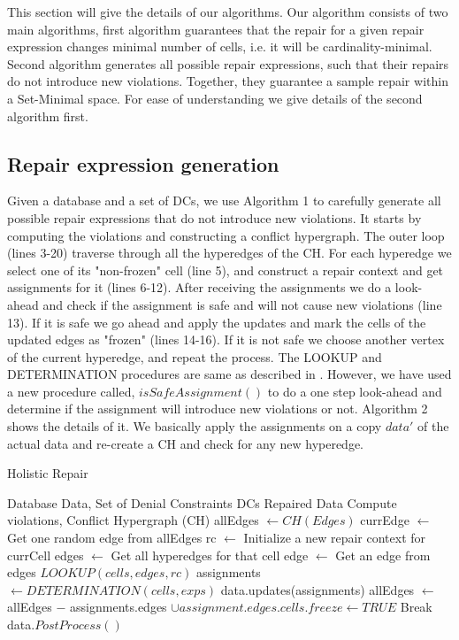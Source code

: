 This section will give the details of our algorithms.
Our algorithm consists of two main algorithms, first algorithm guarantees that the repair for a given repair expression changes minimal number of cells, i.e. it will be cardinality-minimal.
Second algorithm generates all possible repair expressions, such that their repairs do not introduce new violations.
Together, they guarantee a sample repair within a Set-Minimal space.
For ease of understanding we give details of the second algorithm first.

\subsection{Repair expression generation}
Given a database and a set of DCs, we use Algorithm 1 to carefully generate all possible repair expressions that do not introduce new violations.
It starts by computing the violations and constructing a conflict hypergraph.
The outer loop (lines 3-20) traverse through all the hyperedges of the CH.
For each hyperedge we select one of its "non-frozen" cell (line 5), and construct a repair context and get assignments for it (lines 6-12).
After receiving the assignments we do a look-ahead and check if the assignment is safe and will not cause new violations (line 13).
If it is safe we go ahead and apply the updates and mark the cells of the updated edges as "frozen" (lines 14-16).
If it is not safe we choose another vertex of the current hyperedge, and repeat the process.
The LOOKUP and DETERMINATION procedures are same as described in \cite{XuChu}.
However, we have used a new procedure called, $isSafeAssignment()$ to do a one step look-ahead and determine if the assignment will introduce new violations or not.
Algorithm 2 shows the details of it.
We basically apply the assignments on a copy $data'$ of the actual data and re-create a CH and check for any new hyperedge.

\begin{algorithm}
\caption{Holistic Repair}
\begin{algorithmic}[1] 
\REQUIRE Database Data, Set of Denial Constraints DCs
\ENSURE Repaired Data
\STATE Compute violations, Conflict Hypergraph (CH)
\STATE allEdges $\leftarrow CH(Edges)$
\STATE currEdge $\leftarrow$ Get one random edge from allEdges
\STATE rc $\leftarrow$ Initialize a new repair context for currCell
\STATE edges $\leftarrow$ Get all hyperedges for that cell
\STATE edge $\leftarrow$ Get an edge from edges
\STATE $LOOKUP(cells,edges,rc)$
\ENDWHILE
\STATE assignments $\leftarrow DETERMINATION(cells,exps)$
\STATE data.updates(assignments)
\STATE allEdges $\leftarrow$ allEdges $-$ assignments.edges
\STATE $\cup assignment.edges.cells.freeze \leftarrow TRUE$
\STATE Break
\ENDIF
\ENDWHILE
\ENDWHILE
\RETURN data.$PostProcess()$
\end{algorithmic}
\end{algorithm}


